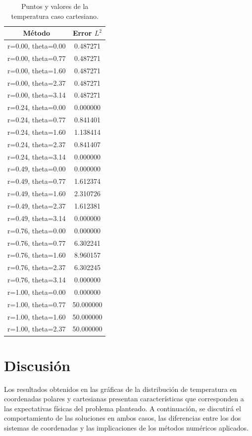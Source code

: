\begin{table}[h!]
    \centering
    \begin{tabular}{|c|c|}
    \hline
    Método & Error \(L^2\) \\
    \hline
    r=0.00, theta=0.00 & 0.487271 \\
    r=0.00, theta=0.77 & 0.487271 \\
    r=0.00, theta=1.60 & 0.487271 \\
    r=0.00, theta=2.37 & 0.487271 \\
    r=0.00, theta=3.14 & 0.487271 \\
    r=0.24, theta=0.00 & 0.000000 \\
    r=0.24, theta=0.77 & 0.841401 \\
    r=0.24, theta=1.60 & 1.138414 \\
    r=0.24, theta=2.37 & 0.841407 \\
    r=0.24, theta=3.14 & 0.000000 \\
    r=0.49, theta=0.00 & 0.000000 \\
    r=0.49, theta=0.77 & 1.612374 \\
    r=0.49, theta=1.60 & 2.310726 \\
    r=0.49, theta=2.37 & 1.612381 \\
    r=0.49, theta=3.14 & 0.000000 \\
    r=0.76, theta=0.00 & 0.000000 \\
    r=0.76, theta=0.77 & 6.302241 \\
    r=0.76, theta=1.60 & 8.960157 \\
    r=0.76, theta=2.37 & 6.302245 \\
    r=0.76, theta=3.14 & 0.000000 \\
    r=1.00, theta=0.00 & 0.000000 \\
    r=1.00, theta=0.77 & 50.000000 \\
    r=1.00, theta=1.60 & 50.000000 \\
    r=1.00, theta=2.37 & 50.000000 \\
    \hline
    \end{tabular}
    \caption{Puntos y valores de la temperatura caso cartesiano.}
    \label{tab:caso_polar}
\end{table}


\chapter{Discusión}

Los resultados obtenidos en las gráficas de la distribución de temperatura en coordenadas polares y cartesianas presentan características que corresponden a las expectativas físicas del problema planteado. A continuación, se discutirá el comportamiento de las soluciones en ambos casos, las diferencias entre los dos sistemas de coordenadas y las implicaciones de los métodos numéricos aplicados.

